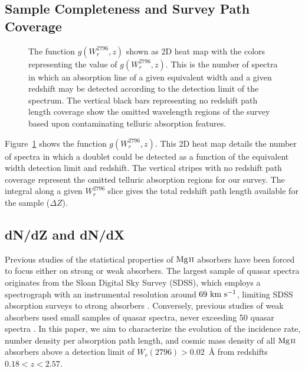 \documentclass[iop,apj,numberedappendix,appendixfloats,twocolappendix]{emulateapj}
\begin{document}
\subsection{Sample Completeness and Survey Path Coverage}

\begin{figure}[bth]
\caption{The function $g(W_r^{2796}, z)$ shown as 2D heat map with the colors representing the value of $g(W_r^{2796}, z)$. This is the number of spectra in which an absorption line of a given equivalent width and a given redshift may be detected according to the detection limit of the spectrum. The vertical black bars representing no redshift path length coverage show the omitted wavelength regions of the survey based upon contaminating telluric absorption features.}
\label{fig:gwz}
\end{figure}

Figure~\ref{fig:gwz} shows the function $g(W_r^{2796}, z)$. This 2D heat map details the number of spectra in which a {\MgIIdblt} doublet could be detected as a function of the equivalent width detection limit and redshift. The vertical stripes with no redshift path coverage represent the omitted telluric absorption regions for our survey. The integral along a given $W_r^{2796}$ slice gives the total redshift path length available for the sample ($\Delta Z$). 

\subsection{dN/dZ and dN/dX}
\label{dndzdndx}

Previous studies of the statistical properties of ${\hbox{{\rm Mg}\kern 0.1em{\sc ii}}}$ absorbers have been forced to focus either on strong or weak absorbers. The largest sample of quasar spectra originates from the Sloan Digital Sky Survey (SDSS), which employs a spectrograph with an instrumental resolution around $69~\hbox{km~s$^{-1}$}$, limiting SDSS absorption surveys to strong absorbers \citep{Tytler1987,Nestor2005,Zhu2013,Cooksey2013}. Conversely, previous studies of weak absorbers used small samples of quasar spectra, never exceeding 50 quasar spectra \citep{Steidel1992,Narayanan2005,Kacprzak2011}. In this paper, we aim to characterize the evolution of the incidence rate, number density per absorption path length, and cosmic mass density of all ${\hbox{{\rm Mg}\kern 0.1em{\sc ii}}}$ absorbers above a detection limit of $W_r(2796) > 0.02$~{\AA} from redshifts $0.18 < z < 2.57$.
\end{document}
